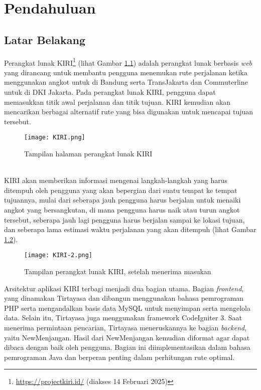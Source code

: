 \chapter{Pendahuluan}
\label{chap:intro}
   
\section{Latar Belakang}
\label{sec:label}
Perangkat lunak KIRI\footnote{\url{https://projectkiri.id/} (diakses 14 Februari 2025)} (lihat Gambar \ref{fig:kiri}) adalah perangkat lunak berbasis \textit{web} yang dirancang untuk membantu pengguna menemukan rute perjalanan ketika menggunakan angkot untuk di Bandung serta TransJakarta dan Commuterline untuk di DKI Jakarta. Pada perangkat lunak KIRI, pengguna dapat memasukkan titik awal perjalanan dan titik tujuan. KIRI kemudian akan mencarikan berbagai alternatif rute yang bisa digunakan untuk mencapai tujuan tersebut.
\begin{figure}[h] 
	\centering  
	\texttt{[image: KIRI.png]}  
	\caption{Tampilan halaman perangkat lunak KIRI}
	\label{fig:kiri} 
\end{figure}
\\
KIRI akan memberikan informasi mengenai langkah-langkah yang harus ditempuh oleh pengguna yang akan bepergian dari suatu tempat ke tempat tujuannya, mulai dari seberapa jauh pengguna harus berjalan untuk menaiki angkot yang bersangkutan, di mana pengguna harus naik atau turun angkot tersebut, seberapa jauh lagi pengguna harus berjalan sampai ke lokasi tujuan, dan seberapa lama estimasi waktu perjalanan yang akan ditempuh (lihat Gambar \ref{fig:kiri2}).
\begin{figure}[H] 
	\centering  
	\texttt{[image: KIRI-2.png]}  
	\caption{Tampilan perangkat lunak KIRI, setelah menerima masukan}
	\label{fig:kiri2} 
\end{figure}
\noindent
Arsitektur aplikasi KIRI terbagi menjadi dua bagian utama. Bagian \textit{frontend}, yang dinamakan Tirtayasa dan dibangun menggunakan bahasa pemrograman PHP serta mengandalkan basis data MySQL untuk menyimpan serta mengelola data. Selain itu, Tirtayasa juga menggunakan framework CodeIgniter 3. Saat menerima permintaan pencarian, Tirtayasa meneruskannya ke bagian \textit{backend}, yaitu NewMenjangan. Hasil dari NewMenjangan kemudian diformat agar dapat dibaca dengan baik oleh pengguna. Bagian ini diimplementasikan dalam bahasa pemrograman Java dan berperan penting dalam perhitungan rute optimal.~\cite{nugroho_natali:17:KIRI}
